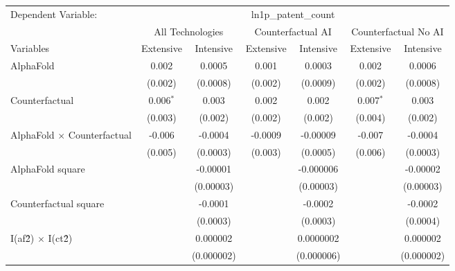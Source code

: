 \begingroup
\centering
\begin{tabular}{lcccccc}
   \tabularnewline \midrule \midrule
   Dependent Variable: & \multicolumn{6}{c}{ln1p\_patent\_count}\\
 & \multicolumn{2}{c}{All Technologies} & \multicolumn{2}{c}{Counterfactual AI} & \multicolumn{2}{c}{Counterfactual No AI} \\
\cmidrule(lr){1-1}\cmidrule(lr){2-3} \cmidrule(lr){4-5} \cmidrule(lr){6-7}
Variables & \multicolumn{1}{c}{Extensive} & \multicolumn{1}{c}{Intensive} & \multicolumn{1}{c}{Extensive} & \multicolumn{1}{c}{Intensive} & \multicolumn{1}{c}{Extensive} & \multicolumn{1}{c}{Intensive} \\
\cmidrule(lr){1-1}\cmidrule(lr){2-2} \cmidrule(lr){3-3} \cmidrule(lr){4-4} \cmidrule(lr){5-5} \cmidrule(lr){6-6} \cmidrule(lr){7-7}
   AlphaFold                          & 0.002       & 0.0005     & 0.001   & 0.0003     & 0.002       & 0.0006\\   
                                      & (0.002)     & (0.0008)   & (0.002) & (0.0009)   & (0.002)     & (0.0008)\\   
   Counterfactual                     & 0.006$^{*}$ & 0.003      & 0.002   & 0.002      & 0.007$^{*}$ & 0.003\\   
                                      & (0.003)     & (0.002)    & (0.002) & (0.002)    & (0.004)     & (0.002)\\   
   AlphaFold $\times$ Counterfactual  & -0.006      & -0.0004    & -0.0009 & -0.00009   & -0.007      & -0.0004\\   
                                      & (0.005)     & (0.0003)   & (0.003) & (0.0005)   & (0.006)     & (0.0003)\\   
   AlphaFold square                   &             & -0.00001   &         & -0.000006  &             & -0.00002\\   
                                      &             & (0.00003)  &         & (0.00003)  &             & (0.00003)\\   
   Counterfactual square              &             & -0.0001    &         & -0.0002    &             & -0.0002\\   
                                      &             & (0.0003)   &         & (0.0003)   &             & (0.0004)\\   
   I(af\^2) $\times$ I(ct\^2)         &             & 0.000002   &         & 0.0000002  &             & 0.000002\\   
                                      &             & (0.000002) &         & (0.000006) &             & (0.000002)\\   

\end{tabular}
